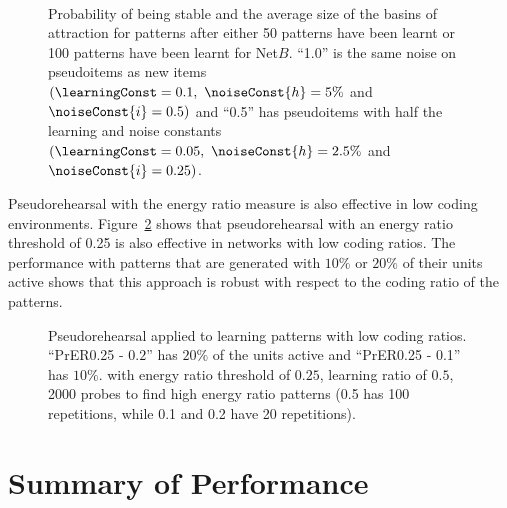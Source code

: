 \begin{figure}[p]
\center
\small
	\scalebox{0.60}{}
	\scalebox{0.60}{}
	\vspace{0.5cm}\\
	\scalebox{0.60}{}
	\scalebox{0.60}{}
	\caption{Probability of being stable and the average size of the basins of attraction for patterns after either 50 patterns have been learnt or 100 patterns have been learnt for Net$B$. ``1.0''  is the same noise on pseudoitems as new items $(\learningConst = 0.1,\ \noiseConst{h}=5\%$ and $\noiseConst{i}=0.5)$ and ``0.5'' has pseudoitems with half the learning and noise constants $(\learningConst = 0.05,\  \noiseConst{h}=2.5\%$ and $\noiseConst{i}=0.25)$.}
	\label{fig:PrER0.25-learningRatio}
\end{figure}

Pseudorehearsal with the energy ratio measure is also effective in low coding environments.  Figure~\ref{fig:PRlowAct} shows that pseudorehearsal with an energy ratio threshold of 0.25 is also effective in networks with low coding ratios.  The performance with patterns that are generated with $10\%$ or $20\%$ of their units active shows that this approach is robust with respect to the coding ratio of the patterns.

\begin{figure}[ht]
\center
\small
	
	\caption{Pseudorehearsal applied to learning patterns with low coding ratios.  ``PrER0.25\noiseConst{} - $0.2$'' has $20\%$ of the units active and ``PrER0.25\noiseConst{} - 0.1'' has $10\%$.  with energy ratio threshold of $0.25$, learning ratio of $0.5$, 2000 probes to find high energy ratio patterns (0.5 has 100 repetitions, while  0.1 and 0.2 have 20 repetitions).}
	\label{fig:PRlowAct}
\end{figure}


\section{Summary of Performance}

